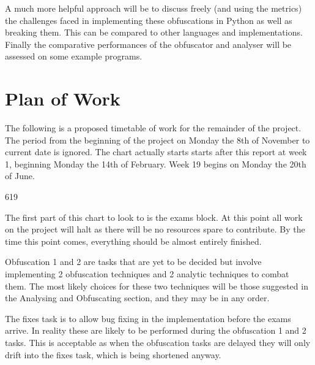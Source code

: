 \documentclass{report}
\begin{document}
A much more helpful approach will be to discuss freely (and using the metrics) the challenges faced in implementing these obfuscations
in Python as well as breaking them. This can be compared to other languages and implementations. Finally the comparative performances
of the obfuscator and analyser will be assessed on some example programs.

\section{Plan of Work}

The following is a proposed timetable of work for the remainder of the project. The period from the beginning of the project on Monday
the 8th of November to current date is ignored. The chart actually starts starts after this report at week 1, beginning Monday the 14th
of February. Week 19 begins on Monday the 20th of June.

\begin{PstGanttChart}[
    ChartShowIntervals,
    ChartUnitIntervalName={},
    ]{6}{19}
\end{PstGanttChart}

The first part of this chart to look to is the exams block. At this point all work on the project will halt as there will be no
resources spare to contribute. By the time this point comes, everything should be almost entirely finished.

Obfuscation 1 and 2 are tasks that are yet to be decided but involve implementing 2 obfuscation techniques and 2 analytic techniques
to combat them. The most likely choices for these two techniques will be those suggested in the Analysing and Obfuscating section, and
they may be in any order.

The fixes task is to allow bug fixing in the implementation before the exams arrive. In reality these are likely to be performed during
the obfuscation 1 and 2 tasks. This is acceptable as when the obfuscation tasks are delayed they will only drift into the fixes task,
which is being shortened anyway.
\end{document}
